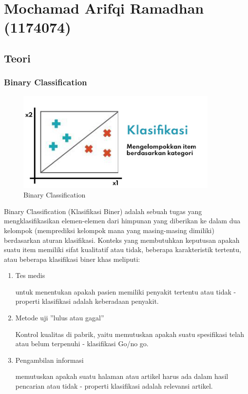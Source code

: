 \section{Mochamad Arifqi Ramadhan (1174074)}
\subsection{Teori}

\subsubsection{Binary Classification}
\begin{figure}[H]
\centerline{\includegraphics[width=10cm]{figures/1174074/2/1.jpg}}
\caption{Binary Classification}
\label{labelgambar}
\end{figure}
Binary Classification (Klasifikasi Biner) adalah sebuah tugas yang mengklasifikasikan elemen-elemen dari himpunan yang diberikan ke dalam dua kelompok (memprediksi kelompok mana yang masing-masing dimiliki) berdasarkan aturan klasifikasi. Konteks yang membutuhkan keputusan apakah suatu item memiliki sifat kualitatif atau tidak, beberapa karakteristik tertentu, atau beberapa klasifikasi
biner khas meliputi:
\begin{enumerate}
\item Tes medis 

untuk menentukan apakah pasien memiliki penyakit tertentu atau tidak - properti klasifikasi adalah keberadaan penyakit.

\item Metode uji ”lulus atau gagal”

Kontrol kualitas di pabrik, yaitu memutuskan apakah suatu spesifikasi telah atau belum terpenuhi - klasifikasi Go/no go.

\item Pengambilan informasi

memutuskan apakah suatu halaman atau artikel harus ada dalam hasil pencarian atau tidak - properti klasifikasi adalah relevansi artikel.
\end{enumerate}

